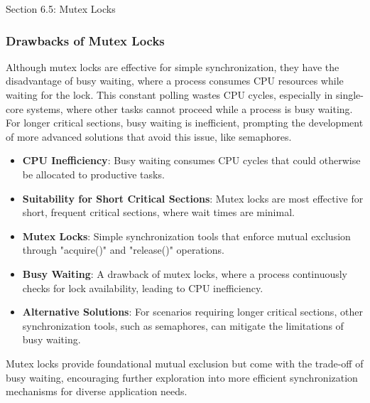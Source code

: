 \begin{notes}{Section 6.5: Mutex Locks}
    \subsubsection*{Drawbacks of Mutex Locks}
    
    Although mutex locks are effective for simple synchronization, they have the disadvantage of busy waiting, where a process consumes CPU resources while waiting for the lock. This constant polling 
    wastes CPU cycles, especially in single-core systems, where other tasks cannot proceed while a process is busy waiting. For longer critical sections, busy waiting is inefficient, prompting the 
    development of more advanced solutions that avoid this issue, like semaphores.
    
    \begin{highlight}
    
        \begin{itemize}
            \item \textbf{CPU Inefficiency}: Busy waiting consumes CPU cycles that could otherwise be allocated to productive tasks.
            \item \textbf{Suitability for Short Critical Sections}: Mutex locks are most effective for short, frequent critical sections, where wait times are minimal.
        \end{itemize}
    
    \end{highlight}
    
    \begin{highlight}
    
        \begin{itemize}
            \item \textbf{Mutex Locks}: Simple synchronization tools that enforce mutual exclusion through "acquire()" and "release()" operations.
            \item \textbf{Busy Waiting}: A drawback of mutex locks, where a process continuously checks for lock availability, leading to CPU inefficiency.
            \item \textbf{Alternative Solutions}: For scenarios requiring longer critical sections, other synchronization tools, such as semaphores, can mitigate the limitations of busy waiting.
        \end{itemize}
    
    Mutex locks provide foundational mutual exclusion but come with the trade-off of busy waiting, encouraging further exploration into more efficient synchronization mechanisms for diverse application needs.
    
    \end{highlight}
\end{notes}

